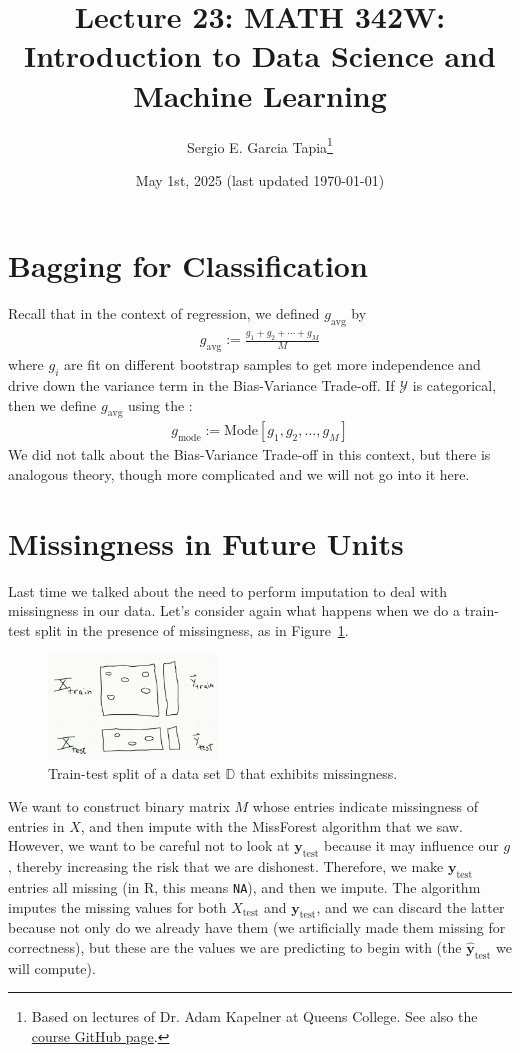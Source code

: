 \documentclass[12pt, a4paper]{article}
\title{Lecture 23: MATH 342W: Introduction to Data Science and Machine Learning}
\author{Sergio E. Garcia Tapia\thanks{Based on lectures of Dr. Adam Kapelner at Queens College.
See also the \href{https://github.com/kapelner/QC_MATH_342W_Spring_2025}{course GitHub page}.}}
\date{May 1st, 2025 (last updated \today)}
\theoremstyle{definition}
\begin{document}
	\maketitle
	\section{Bagging for Classification}
	Recall that in the context of regression, we defined $g_{\text{avg}}$ by
	\begin{align*}
		g_{\text{avg}} := \frac{g_1 + g_2 + \cdots + g_M}{M}
	\end{align*}
	where $g_i$ are fit on different bootstrap samples to get more independence
	and drive down the variance term in the Bias-Variance Trade-off. If
	$\mathcal{Y}$ is categorical, then we define $g_{\text{avg}}$ using
	the :
	\begin{align*}
		g_{\text{mode}} := \text{Mode}[g_1, g_2, \ldots,g_M]
	\end{align*}
	We did not talk about the Bias-Variance Trade-off in this context, but there
	is analogous theory, though more complicated and we will not go into it here.
	\section{Missingness in Future Units}
	Last time we talked about the need to perform imputation to deal with missingness
	in our data. Let's consider again what happens when we do a train-test split
	in the presence of missingness, as in Figure~\ref{fig:train-test-missing}.
	\begin{figure}
		\centering
		\includegraphics[width=0.4\textwidth]{train-test-split-missingness}
		\caption{Train-test split of a data set $\mathbb{D}$ that exhibits
		missingness.}
		\label{fig:train-test-missing}
	\end{figure}
	We want to construct binary matrix $M$ whose entries indicate missingness of entries
	in $X$, and then impute with the MissForest algorithm that we saw. However,
	we want to be careful not to look at $\bm{y}_{\text{test}}$ because it may
	influence our $g$, thereby increasing the risk that we are dishonest. Therefore,
	we make $\bm{y}_{\text{test}}$ entries all missing (in R, this means \texttt{NA}),
	and then we impute. The algorithm imputes the missing values for both $X_{\text{test}}$
	and $\bm{y}_{\text{test}}$, and we can discard the latter because not only do
	we already have them (we artificially made them missing for correctness), but
	these are the values we are predicting to begin with (the $\hat{\bm{y}}_{\text{test}}$
	we will compute).
	
\end{document}
